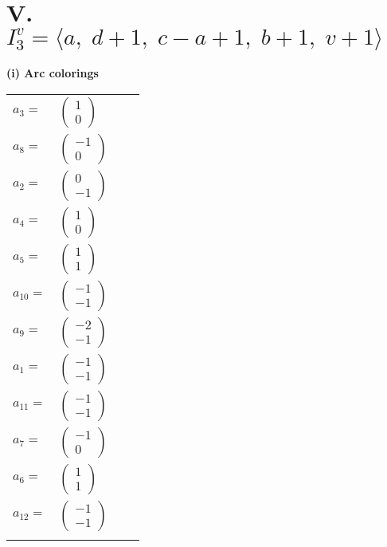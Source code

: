 \documentclass[1p]{elsarticle_modified}
\theoremstyle{definition}
\begin{document}
\centering \section*{V. $I^v_{3}= \langle a,\;d+1,\;c- a+1,\;b+1,\;v+1 \rangle$}
\flushleft \textbf{(i) Arc colorings}\\
\begin{tabular}{m{7pt} m{180pt} m{7pt} m{180pt} }
\flushright $a_{3}=$&$\begin{pmatrix}1\\0\end{pmatrix}$ \\
\flushright $a_{8}=$&$\begin{pmatrix}-1\\0\end{pmatrix}$ \\
\flushright $a_{2}=$&$\begin{pmatrix}0\\-1\end{pmatrix}$ \\
\flushright $a_{4}=$&$\begin{pmatrix}1\\0\end{pmatrix}$ \\
\flushright $a_{5}=$&$\begin{pmatrix}1\\1\end{pmatrix}$ \\
\flushright $a_{10}=$&$\begin{pmatrix}-1\\-1\end{pmatrix}$ \\
\flushright $a_{9}=$&$\begin{pmatrix}-2\\-1\end{pmatrix}$ \\
\flushright $a_{1}=$&$\begin{pmatrix}-1\\-1\end{pmatrix}$ \\
\flushright $a_{11}=$&$\begin{pmatrix}-1\\-1\end{pmatrix}$ \\
\flushright $a_{7}=$&$\begin{pmatrix}-1\\0\end{pmatrix}$ \\
\flushright $a_{6}=$&$\begin{pmatrix}1\\1\end{pmatrix}$ \\
\flushright $a_{12}=$&$\begin{pmatrix}-1\\-1\end{pmatrix}$\\&\end{tabular}
\end{document}
